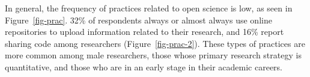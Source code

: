 \documentclass[
  letterpaper,
]{article}
\begin{document}
In general, the frequency of practices related to open science is low,
as seen in Figure~\ref{fig-prac}. 32\% of respondents always or almost
always use online repositories to upload information related to their
research, and 16\% report sharing code among researchers
(Figure~\ref{fig-prac-2}). These types of practices are more common
among male researchers, those whose primary research strategy is
quantitative, and those who are in an early stage in their academic
careers.

\begin{figure}

\begin{minipage}{0.50\linewidth}



\end{minipage}%
%
\begin{minipage}{0.50\linewidth}

\centering{

}
\end{minipage}
\end{figure}
\end{document}

